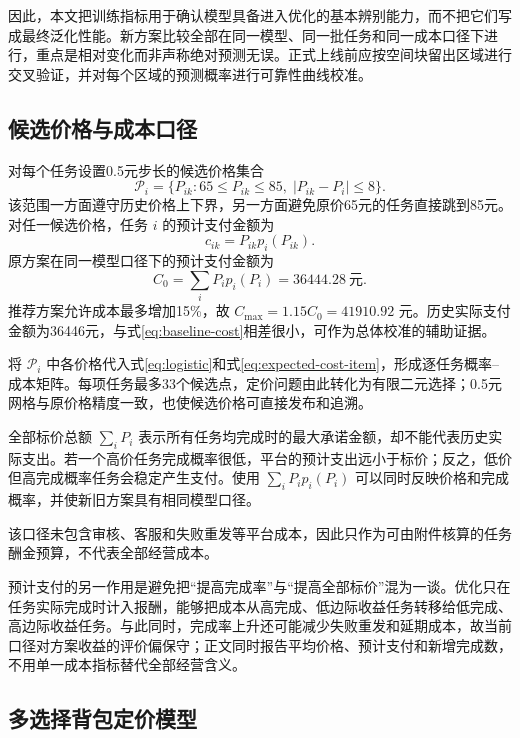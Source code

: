 ﻿\documentclass[UTF8,zihao=-4,a4paper,fontset=fandol]{ctexart}
\begin{document}
因此，本文把训练指标用于确认模型具备进入优化的基本辨别能力，而不把它们写成最终泛化性能。新方案比较全部在同一模型、同一批任务和同一成本口径下进行，重点是相对变化而非声称绝对预测无误。正式上线前应按空间块留出区域进行交叉验证，并对每个区域的预测概率进行可靠性曲线校准。

\subsection{候选价格与成本口径}

对每个任务设置0.5元步长的候选价格集合
\begin{equation}
\mathcal P_i=\{P_{ik}:65\le P_{ik}\le85,\;
|P_{ik}-P_i|\le8\}.
\label{eq:candidate}
\end{equation}
该范围一方面遵守历史价格上下界，另一方面避免原价65元的任务直接跳到85元。对任一候选价格，任务 $i$ 的预计支付金额为
\begin{equation}
c_{ik}=P_{ik}p_i(P_{ik}).
\label{eq:expected-cost-item}
\end{equation}
原方案在同一模型口径下的预计支付金额为
\begin{equation}
C_0=\sum_iP_ip_i(P_i)=36444.28\ \text{元}.
\label{eq:baseline-cost}
\end{equation}
推荐方案允许成本最多增加15\%，故 $C_{\max}=1.15C_0=41910.92$ 元。历史实际支付金额为36446元，与式\eqref{eq:baseline-cost}相差很小，可作为总体校准的辅助证据。

将 $\mathcal P_i$ 中各价格代入式\eqref{eq:logistic}和式\eqref{eq:expected-cost-item}，形成逐任务概率--成本矩阵。每项任务最多33个候选点，定价问题由此转化为有限二元选择；0.5元网格与原价格精度一致，也使候选价格可直接发布和追溯。

全部标价总额 $\sum_iP_i$ 表示所有任务均完成时的最大承诺金额，却不能代表历史实际支出。若一个高价任务完成概率很低，平台的预计支出远小于标价；反之，低价但高完成概率任务会稳定产生支付。使用 $\sum_iP_ip_i(P_i)$ 可以同时反映价格和完成概率，并使新旧方案具有相同模型口径。

该口径未包含审核、客服和失败重发等平台成本，因此只作为可由附件核算的任务酬金预算，不代表全部经营成本。

预计支付的另一作用是避免把“提高完成率”与“提高全部标价”混为一谈。优化只在任务实际完成时计入报酬，能够把成本从高完成、低边际收益任务转移给低完成、高边际收益任务。与此同时，完成率上升还可能减少失败重发和延期成本，故当前口径对方案收益的评价偏保守；正文同时报告平均价格、预计支付和新增完成数，不用单一成本指标替代全部经营含义。

\subsection{多选择背包定价模型}
\end{document}
